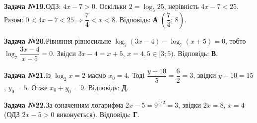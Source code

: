 \documentclass[12pt]{article}
\begin{document}
\par\vspace{0.3cm}\noindent\hypertarget{sol:19}{}
\begin{tcolorbox}[colback=titleBg!40, colframe=mainGreen!55, boxrule=0.4pt, arc=2pt, left=6pt, right=6pt, top=4pt, bottom=4pt, breakable]
\noindent\small\textbf{Задача №19.}\quad ОДЗ: $4x-7>0$. Оскільки $2=\log_5 25$, нерівність $4x-7<25$. Разом: $0<4x-7<25\Rightarrow \dfrac74<x<8$. Відповідь: \textbf{А} $\left(\dfrac74;\,8\right)$.
\par\vspace{0.1cm}\hfill\hyperlink{task:19}{}
\end{tcolorbox}
\par\vspace{0.3cm}\noindent\hypertarget{sol:20}{}
\begin{tcolorbox}[colback=titleBg!40, colframe=mainGreen!55, boxrule=0.4pt, arc=2pt, left=6pt, right=6pt, top=4pt, bottom=4pt, breakable]
\noindent\small\textbf{Задача №20.}\quad Рівняння рівносильне $\log_7(3x-4)-\log_7(x+5)=0$, тобто $\log_7\dfrac{3x-4}{x+5}=0$. Звідси $3x-4=x+5$, $x=4{,}5\in[3;5)$. Відповідь: \textbf{В}.
\par\vspace{0.1cm}\hfill\hyperlink{task:20}{}
\end{tcolorbox}
\par\vspace{0.3cm}\noindent\hypertarget{sol:21}{}
\begin{tcolorbox}[colback=titleBg!40, colframe=mainGreen!55, boxrule=0.4pt, arc=2pt, left=6pt, right=6pt, top=4pt, bottom=4pt, breakable]
\noindent\small\textbf{Задача №21.}\quad Із $\log_2 x = 2$ маємо $x_0 = 4$. Тоді $\dfrac{y+10}{5} = \dfrac{6}{2} = 3$, звідки $y+10 = 15$, $y_0 = 5$. Отже $x_0 + y_0 = 9$. Відповідь: \textbf{Д}.
\par\vspace{0.1cm}\hfill\hyperlink{task:21}{}
\end{tcolorbox}
\par\vspace{0.3cm}\noindent\hypertarget{sol:22}{}
\begin{tcolorbox}[colback=titleBg!40, colframe=mainGreen!55, boxrule=0.4pt, arc=2pt, left=6pt, right=6pt, top=4pt, bottom=4pt, breakable]
\noindent\small\textbf{Задача №22.}\quad За означенням логарифма $2x-5=9^{1/2}=3$, звідки $2x=8$, $x=4$ (ОДЗ $2x-5>0$ виконується). Відповідь: \textbf{Г}.
\par\vspace{0.1cm}\hfill\hyperlink{task:22}{}
\end{tcolorbox}
\end{document}
